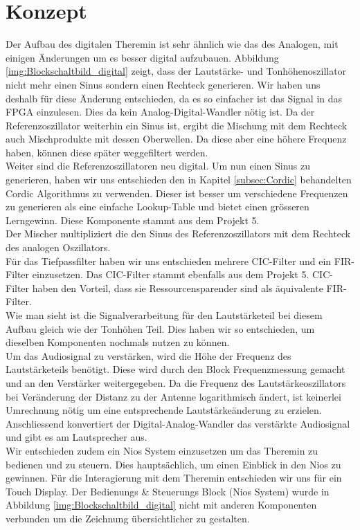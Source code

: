 \clearpage
\section{Konzept}\label{sec:Konzept}
Der Aufbau des digitalen Theremin ist sehr ähnlich wie das des Analogen, mit einigen Änderungen um es besser digital aufzubauen. Abbildung \ref{img:Blockschaltbild_digital} zeigt, dass der Lautstärke- und Tonhöhenoszillator nicht mehr einen Sinus sondern einen Rechteck generieren. Wir haben uns deshalb für diese Änderung entschieden, da es so einfacher ist das Signal in das FPGA einzulesen. Dies da kein Analog-Digital-Wandler nötig ist. Da der Referenzoszillator weiterhin ein Sinus ist, ergibt die Mischung mit dem Rechteck auch Mischprodukte mit dessen Oberwellen. Da diese aber eine höhere Frequenz haben, können diese später weggefiltert werden.\\
Weiter sind die Referenzoszillatoren neu digital. Um nun einen Sinus zu generieren, haben wir uns entschieden den in Kapitel \ref{subsec:Cordic} behandelten Cordic Algorithmus zu verwenden. Dieser ist besser um verschiedene Frequenzen zu generieren als eine einfache Lookup-Table und bietet einen grösseren Lerngewinn. Diese Komponente stammt aus dem Projekt 5. \\
Der Mischer multipliziert die den Sinus des Referenzoszillators mit dem Rechteck des analogen Oszillators.\\
Für das Tiefpassfilter haben wir uns entschieden mehrere CIC-Filter und ein FIR-Filter einzusetzen. Das CIC-Filter stammt ebenfalls aus dem Projekt 5. CIC-Filter haben den Vorteil, dass sie Ressourcensparender sind als äquivalente FIR-Filter.\\
Wie man sieht ist die Signalverarbeitung für den Lautstärketeil bei diesem Aufbau gleich wie der Tonhöhen Teil. Dies haben wir so entschieden, um dieselben Komponenten nochmals nutzen zu können.\\
Um das Audiosignal zu verstärken, wird die Höhe der Frequenz des Lautstärketeils benötigt. Diese wird durch den Block Frequenzmessung gemacht und an den Verstärker weitergegeben. Da die Frequenz des Lautstärkeoszillators bei Veränderung der Distanz zu der Antenne logarithmisch ändert, ist keinerlei Umrechnung nötig um eine entsprechende Lautstärkeänderung zu erzielen.
Anschliessend konvertiert der Digital-Analog-Wandler das verstärkte Audiosignal und gibt es am Lautsprecher aus.\\
Wir entschieden zudem ein Nios System einzusetzen um das Theremin zu bedienen und zu steuern. Dies hauptsächlich, um einen Einblick in den Nios zu gewinnen. Für die Interagierung mit dem Theremin entschieden wir uns für ein Touch Display. Der Bedienungs \& Steuerungs Block (Nios System) wurde in Abbildung \ref{img:Blockschaltbild_digital} nicht mit anderen Komponenten verbunden um die Zeichnung übersichtlicher zu gestalten.

